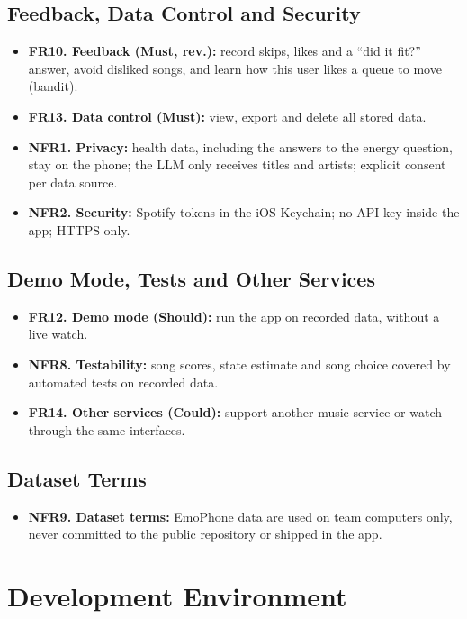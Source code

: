 \documentclass[conference]{IEEEtran}
\begin{document}
\subsection{Feedback, Data Control and Security}
\begin{itemize}
\item \textbf{FR10. Feedback (Must, rev.):} record skips, likes and a ``did it fit?'' answer, avoid disliked songs, and learn how this user likes a queue to move (bandit).
\item \textbf{FR13. Data control (Must):} view, export and delete all stored data.
\item \textbf{NFR1. Privacy:} health data, including the answers to the energy question, stay on the phone; the LLM only receives titles and artists; explicit consent per data source.
\item \textbf{NFR2. Security:} Spotify tokens in the iOS Keychain; no API key inside the app; HTTPS only.
\end{itemize}

\subsection{Demo Mode, Tests and Other Services}
\begin{itemize}
\item \textbf{FR12. Demo mode (Should):} run the app on recorded data, without a live watch.
\item \textbf{NFR8. Testability:} song scores, state estimate and song choice covered by automated tests on recorded data.
\item \textbf{FR14. Other services (Could):} support another music service or watch through the same interfaces.
\end{itemize}

\subsection{Dataset Terms}
\begin{itemize}
\item \textbf{NFR9. Dataset terms:} EmoPhone data are used on team computers only, never committed to the public repository or shipped in the app.
\end{itemize}

\section{Development Environment}
\end{document}

